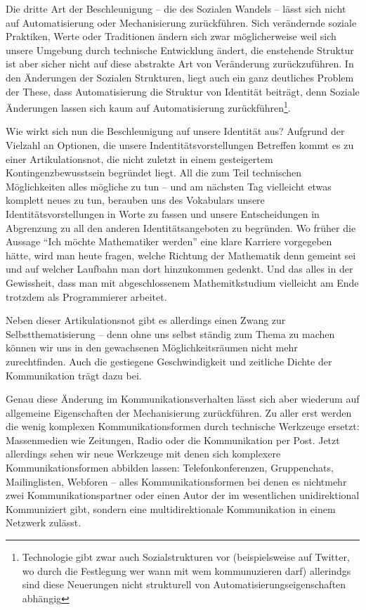 Die dritte Art der Beschleunigung – die des Sozialen Wandels – lässt sich nicht auf Automatisierung oder Mechanisierung zurückführen.
Sich verändernde soziale Praktiken, Werte oder Traditionen ändern sich zwar möglicherweise weil sich unsere Umgebung durch technische Entwicklung ändert, die enstehende Struktur ist aber sicher nicht auf diese abstrakte Art von Veränderung zurückzuführen.
In den Änderungen der Sozialen Strukturen, liegt auch ein ganz deutliches Problem der These, dass Automatisierung die Struktur von Identität beiträgt, denn Soziale Änderungen lassen sich kaum auf Automatisierung zurückführen\footnote{Technologie gibt zwar auch Sozialstrukturen vor (beispielsweise auf Twitter, wo durch die Festlegung wer wann mit wem kommunuzieren darf) allerindgs sind diese Neuerungen nicht strukturell von Automatisierungseigenschaften abhängig}.

Wie wirkt sich nun die Beschleunigung auf unsere Identität aus? Aufgrund der Vielzahl an Optionen, die unsere Indentitätsvorstellungen Betreffen kommt es zu einer Artikulationsnot, die nicht zuletzt in einem gesteigertem Kontingenzbewusstsein begründet liegt.
All die zum Teil technischen Möglichkeiten alles mögliche zu tun – und am nächsten Tag vielleicht etwas komplett neues zu tun, berauben uns des Vokabulars unsere Identitätsvorstellungen in Worte zu fassen und unsere Entscheidungen in Abgrenzung zu all den anderen Identitätsangeboten zu begründen.
Wo früher die Aussage \enquote{Ich möchte Mathematiker werden} eine klare Karriere vorgegeben hätte, wird man heute fragen, welche Richtung der Mathematik denn gemeint sei und auf welcher Laufbahn man dort hinzukommen gedenkt.
Und das alles in der Gewissheit, dass man mit abgeschlossenem Mathemitkstudium vielleicht am Ende trotzdem als Programmierer arbeitet.

Neben dieser Artikulationsnot gibt es allerdings einen Zwang zur Selbstthematisierung – denn ohne uns selbst ständig zum Thema zu machen können wir uns in den gewachsenen Möglichkeitsräumen nicht mehr zurechtfinden.
Auch die gestiegene Geschwindigkeit und zeitliche Dichte der Kommunikation trägt dazu bei.

Genau diese Änderung im Kommunikationsverhalten lässt sich aber wiederum auf allgemeine Eigenschaften der Mechanisierung zurückführen.
Zu aller erst werden die wenig komplexen Kommunikationsformen durch technische Werkzeuge ersetzt: Massenmedien wie Zeitungen, Radio oder die Kommunikation per Post. Jetzt allerdings sehen wir neue Werkzeuge mit denen sich komplexere Kommunikationsformen abbilden lassen: Telefonkonferenzen, Gruppenchats, Mailinglisten, Webforen – alles Kommunikationsformen bei denen es nichtmehr zwei Kommunikationspartner oder einen Autor der im wesentlichen unidirektional Kommuniziert gibt, sondern eine multidirektionale Kommunikation in einem Netzwerk zulässt.

